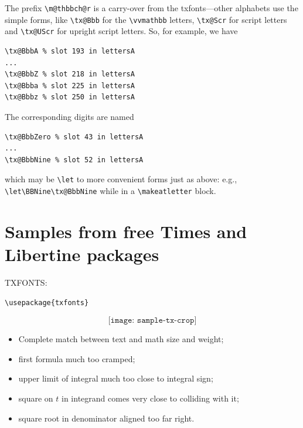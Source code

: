 \documentclass[\fsc]{article}
\theoremstyle{oldplain}
\theoremstyle{plain}
\begin{document}
The prefix \verb|\m@thbbch@r| is a carry-over from the txfonts---other alphabets use the simple forms, like \verb|\tx@Bbb| for the \verb|\vvmathbb| letters, \verb|\tx@Scr| for script letters and \verb|\tx@UScr| for upright script letters. So, for example, we have
\begin{verbatim}
\tx@BbbA % slot 193 in lettersA
...
\tx@BbbZ % slot 218 in lettersA
\tx@Bbba % slot 225 in lettersA
\tx@Bbbz % slot 250 in lettersA
\end{verbatim}
The corresponding digits are named
\begin{verbatim}
\tx@BbbZero % slot 43 in lettersA
...
\tx@BbbNine % slot 52 in lettersA
\end{verbatim}
which may be \verb|\let| to more convenient forms just as above: e.g., \verb|\let\BBNine\tx@BbbNine| while in a \verb|\makeatletter| block.


\section{Samples from free Times and Libertine packages}
\textsc{TXFONTS:}\\
\begin{verbatim}
\usepackage{txfonts}
\end{verbatim}
\[\texttt{[image: sample-tx-crop]}\]
\begin{itemize}
\item
Complete match between text and math size and weight;
\item first formula much too cramped;
\item upper limit of integral much too close to integral sign;
\item square on $t$ in integrand comes very close to colliding with it;
\item square root in denominator aligned too far right.
\end{itemize}
\end{document}
